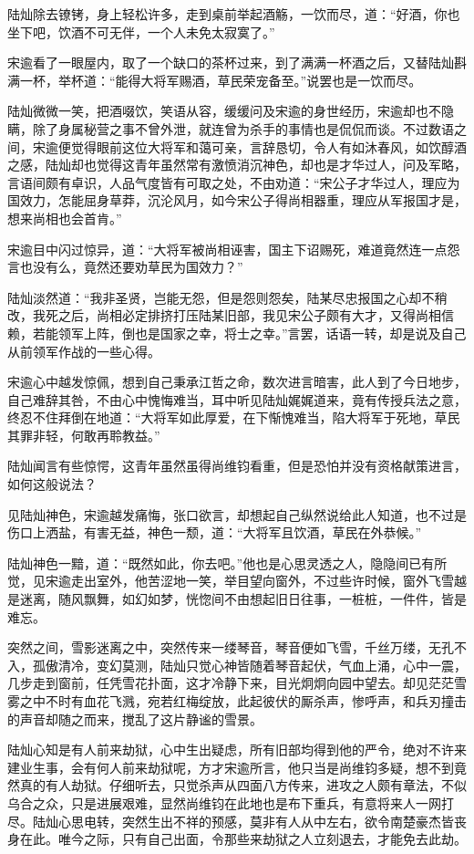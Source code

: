 陆灿除去镣铐，身上轻松许多，走到桌前举起酒觞，一饮而尽，道：“好酒，你也坐下吧，饮酒不可无伴，一个人未免太寂寞了。”

宋逾看了一眼屋内，取了一个缺口的茶杯过来，到了满满一杯酒之后，又替陆灿斟满一杯，举杯道：“能得大将军赐酒，草民荣宠备至。”说罢也是一饮而尽。

陆灿微微一笑，把酒啜饮，笑语从容，缓缓问及宋逾的身世经历，宋逾却也不隐瞒，除了身属秘营之事不曾外泄，就连曾为杀手的事情也是侃侃而谈。不过数语之间，宋逾便觉得眼前这位大将军和蔼可亲，言辞恳切，令人有如沐春风，如饮醇酒之感，陆灿却也觉得这青年虽然常有激愤消沉神色，却也是才华过人，问及军略，言语间颇有卓识，人品气度皆有可取之处，不由劝道：“宋公子才华过人，理应为国效力，怎能屈身草莽，沉沦风月，如今宋公子得尚相器重，理应从军报国才是，想来尚相也会首肯。”

宋逾目中闪过惊异，道：“大将军被尚相诬害，国主下诏赐死，难道竟然连一点怨言也没有么，竟然还要劝草民为国效力？”

陆灿淡然道：“我非圣贤，岂能无怨，但是怨则怨矣，陆某尽忠报国之心却不稍改，我死之后，尚相必定排挤打压陆某旧部，我见宋公子颇有大才，又得尚相信赖，若能领军上阵，倒也是国家之幸，将士之幸。”言罢，话语一转，却是说及自己从前领军作战的一些心得。

宋逾心中越发惊佩，想到自己秉承江哲之命，数次进言暗害，此人到了今日地步，自己难辞其咎，不由心中愧悔难当，耳中听见陆灿娓娓道来，竟有传授兵法之意，终忍不住拜倒在地道：“大将军如此厚爱，在下惭愧难当，陷大将军于死地，草民其罪非轻，何敢再聆教益。”

陆灿闻言有些惊愕，这青年虽然虽得尚维钧看重，但是恐怕并没有资格献策进言，如何这般说法？

见陆灿神色，宋逾越发痛悔，张口欲言，却想起自己纵然说给此人知道，也不过是伤口上洒盐，有害无益，神色一颓，道：“大将军且饮酒，草民在外恭候。”

陆灿神色一黯，道：“既然如此，你去吧。”他也是心思灵透之人，隐隐间已有所觉，见宋逾走出室外，他苦涩地一笑，举目望向窗外，不过些许时候，窗外飞雪越是迷离，随风飘舞，如幻如梦，恍惚间不由想起旧日往事，一桩桩，一件件，皆是难忘。

突然之间，雪影迷离之中，突然传来一缕琴音，琴音便如飞雪，千丝万缕，无孔不入，孤傲清冷，变幻莫测，陆灿只觉心神皆随着琴音起伏，气血上涌，心中一震，几步走到窗前，任凭雪花扑面，这才冷静下来，目光炯炯向园中望去。却见茫茫雪雾之中不时有血花飞溅，宛若红梅绽放，此起彼伏的厮杀声，惨呼声，和兵刃撞击的声音却随之而来，搅乱了这片静谧的雪景。

陆灿心知是有人前来劫狱，心中生出疑虑，所有旧部均得到他的严令，绝对不许来建业生事，会有何人前来劫狱呢，方才宋逾所言，他只当是尚维钧多疑，想不到竟然真的有人劫狱。仔细听去，只觉杀声从四面八方传来，进攻之人颇有章法，不似乌合之众，只是进展艰难，显然尚维钧在此地也是布下重兵，有意将来人一网打尽。陆灿心思电转，突然生出不祥的预感，莫非有人从中左右，欲令南楚豪杰皆丧身在此。唯今之际，只有自己出面，令那些来劫狱之人立刻退去，才能免去此劫。

